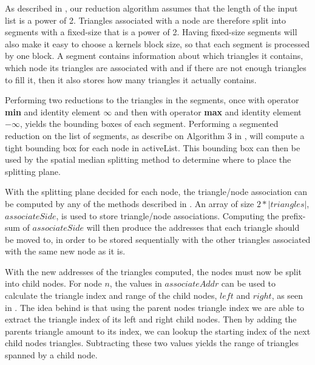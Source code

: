 
As described in , our reduction algorithm
assumes that the length of the input list is a power of 2. Triangles
associated with a node are therefore split into segments with a
fixed-size that is a power of 2. Having fixed-size segments will also
make it easy to choose a kernels block size, so that each segment is
processed by one block. A segment contains information about which
triangles it contains, which node its triangles are associated with
and if there are not enough triangles to fill it, then it also stores
how many triangles it actually contains.

Performing two reductions to the triangles in the segments, once with
operator \textbf{min} and identity element $\infty$ and then with
operator \textbf{max} and identity element $-\infty$, yields the
bounding boxes of each segment. Performing a segmented reduction on
the list of segments, as describe on Algorithm 3 in \zhou, will
compute a tight bounding box for each node in activeList. This
bounding box can then be used by the spatial median splitting method
to determine where to place the splitting plane.

With the splitting plane decided for each node, the triangle/node
association can be computed by any of the methods described in
. An array of size $2 * |triangles|$,
$associateSide$, is used to store triangle/node
associations. Computing the prefix-sum of $associateSide$ will then
produce the addresses that each triangle should be moved to, in order
to be stored sequentially with the other triangles associated with the
same new node as it is.



With the new addresses of the triangles computed, the nodes must now
be split into child nodes. For node $n$, the values in $associateAddr$
can be used to calculate the triangle index and range of the child
nodes, $left$ and $right$, as seen in . The
idea behind  is that using the parent nodes
triangle index we are able to extract the triangle index of its left
and right child nodes. Then by adding the parents triangle amount to
its index, we can lookup the starting index of the next child nodes
triangles. Subtracting these two values yields the range of triangles
spanned by a child node.

